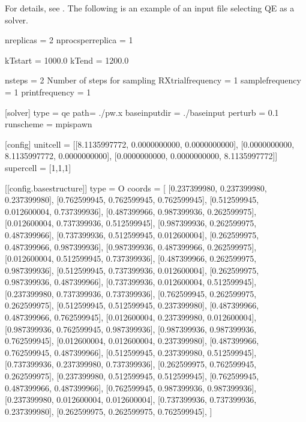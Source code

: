 \documentclass[letterpaper,10pt,english]{sphinxmanual}
\begin{document}
For details, see {\hyperref[\detokenize{file_specification/index::doc}]{}} .
The following is an example of an input file selecting QE as a solver.

\begin{sphinxVerbatim}[commandchars=\\\{\}]
[replica]
nreplicas = 2
nprocs\PYGZus{}per\PYGZus{}replica = 1

kTstart = 1000.0
kTend = 1200.0

nsteps = 2  \PYGZsh{} Number of steps for sampling
RXtrial\PYGZus{}frequency = 1
sample\PYGZus{}frequency = 1
print\PYGZus{}frequency = 1

[solver]
type = \PYGZsq{}qe\PYGZsq{}
path= \PYGZsq{}./pw.x\PYGZsq{}
base\PYGZus{}input\PYGZus{}dir = \PYGZsq{}./baseinput\PYGZsq{}
perturb = 0.1
run\PYGZus{}scheme = \PYGZsq{}mpi\PYGZus{}spawn\PYGZsq{}

[config]
unitcell = [[8.1135997772, 0.0000000000, 0.0000000000],
            [0.0000000000, 8.1135997772, 0.0000000000],
            [0.0000000000, 0.0000000000, 8.1135997772]]
supercell = [1,1,1]

[[config.base\PYGZus{}structure]]
type = \PYGZdq{}O\PYGZdq{}
coords = [
     [0.237399980, 0.237399980, 0.237399980],
     [0.762599945, 0.762599945, 0.762599945],
     [0.512599945, 0.012600004, 0.737399936],
     [0.487399966, 0.987399936, 0.262599975],
     [0.012600004, 0.737399936, 0.512599945],
     [0.987399936, 0.262599975, 0.487399966],
     [0.737399936, 0.512599945, 0.012600004],
     [0.262599975, 0.487399966, 0.987399936],
     [0.987399936, 0.487399966, 0.262599975],
     [0.012600004, 0.512599945, 0.737399936],
     [0.487399966, 0.262599975, 0.987399936],
     [0.512599945, 0.737399936, 0.012600004],
     [0.262599975, 0.987399936, 0.487399966],
     [0.737399936, 0.012600004, 0.512599945],
     [0.237399980, 0.737399936, 0.737399936],
     [0.762599945, 0.262599975, 0.262599975],
     [0.512599945, 0.512599945, 0.237399980],
     [0.487399966, 0.487399966, 0.762599945],
     [0.012600004, 0.237399980, 0.012600004],
     [0.987399936, 0.762599945, 0.987399936],
     [0.987399936, 0.987399936, 0.762599945],
     [0.012600004, 0.012600004, 0.237399980],
     [0.487399966, 0.762599945, 0.487399966],
     [0.512599945, 0.237399980, 0.512599945],
     [0.737399936, 0.237399980, 0.737399936],
     [0.262599975, 0.762599945, 0.262599975],
     [0.237399980, 0.512599945, 0.512599945],
     [0.762599945, 0.487399966, 0.487399966],
     [0.762599945, 0.987399936, 0.987399936],
     [0.237399980, 0.012600004, 0.012600004],
     [0.737399936, 0.737399936, 0.237399980],
     [0.262599975, 0.262599975, 0.762599945],
     ]


\end{sphinxVerbatim}
\end{document}
